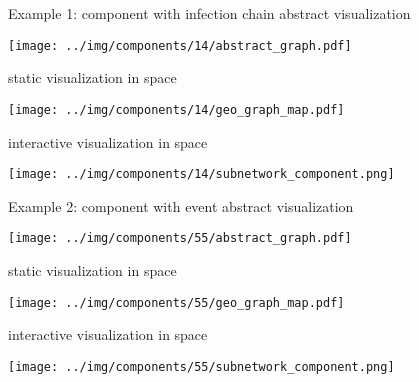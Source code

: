 \documentclass[
  8pt,
  ignorenonframetext,
]{beamer}
\begin{document}
\begin{frame}{Example 1: component with infection chain}
\protect\hypertarget{example-1-component-with-infection-chain}{}
abstract visualization

\begin{center}
\texttt{[image: ../img/components/14/abstract\_graph.pdf]}
\end{center}
\end{frame}

\begin{frame}
static visualization in space

\begin{center}
\texttt{[image: ../img/components/14/geo\_graph\_map.pdf]}
\end{center}
\end{frame}

\begin{frame}
interactive visualization in space

\begin{center}
\texttt{[image: ../img/components/14/subnetwork\_component.png]}
\end{center}
\end{frame}

\begin{frame}{Example 2: component with event}
\protect\hypertarget{example-2-component-with-event}{}
abstract visualization

\begin{center}
\texttt{[image: ../img/components/55/abstract\_graph.pdf]}
\end{center}
\end{frame}

\begin{frame}
static visualization in space

\begin{center}
\texttt{[image: ../img/components/55/geo\_graph\_map.pdf]}
\end{center}
\end{frame}

\begin{frame}
interactive visualization in space

\begin{center}
\texttt{[image: ../img/components/55/subnetwork\_component.png]}
\end{center}
\end{frame}
\end{document}
